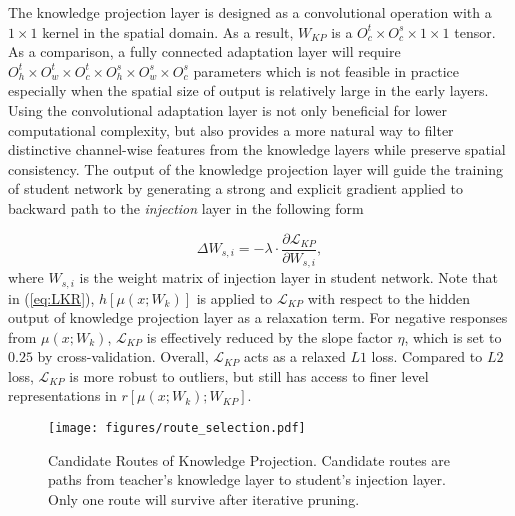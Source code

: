\documentclass[journal]{IEEEtran}
\begin{document}
The knowledge projection layer is designed as a convolutional operation with a $1\times1$ kernel in the spatial domain. As a result, $W_{KP}$ is a $O^t_c \times O^s_c \times 1 \times 1$ tensor. As a comparison, a fully connected adaptation layer will require $O^t_h \times O^t_w \times O^t_c \times O^s_h \times O^s_w \times O^s_c$ parameters which is not feasible in practice especially when the spatial size of output is relatively large in the early layers. Using the convolutional adaptation layer is not only beneficial for lower computational complexity, but also provides a more natural way to filter distinctive channel-wise features from the knowledge layers while preserve spatial consistency. The output of the knowledge projection layer will guide the training of student network by generating a strong and explicit gradient applied to backward path to the \textit{injection} layer in the following form

\begin{equation}
\Delta {W_{s,i}} = - \lambda \cdot \frac{\partial \mathcal{L}_{KP}}{\partial W_{s,i}},
\end{equation}
where $W_{s,i}$ is the weight matrix of injection layer in student network. 
Note that in (\ref{eq:LKR}), $h[\mu(x; W_k)]$ is applied to $\mathcal{L}_{KP}$ with respect to the hidden output of knowledge projection layer as a relaxation term. For negative responses from $\mu(x; W_k)$, $\mathcal{L}_{KP}$ is effectively reduced by the slope factor $\eta$, which is set to $0.25$ by cross-validation. Overall, $\mathcal{L}_{KP}$ acts as a relaxed $L1$ loss. Compared to $L2$ loss, $\mathcal{L}_{KP}$ is more robust to outliers, but still has access to finer level representations in $r[\mu(x; W_k); W_{KP}]$. 


\begin{figure}[ht]
\begin{center}
   \texttt{[image: figures/route\_selection.pdf]}
\end{center}
   \caption{Candidate Routes of Knowledge Projection. Candidate routes are paths from teacher's knowledge layer to student's injection layer. Only one route will survive after iterative pruning.}
\label{fig:route_selection}
\end{figure}


\end{document}
